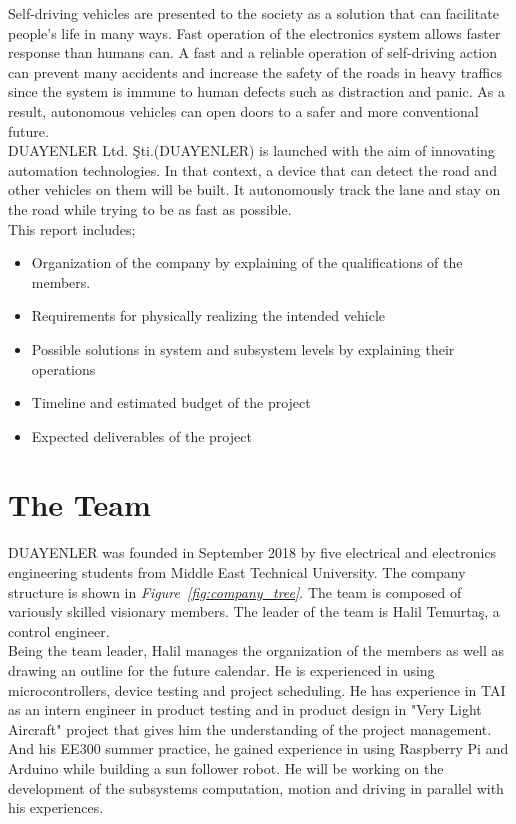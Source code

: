 \documentclass[a4paper,12pt]{article}
\begin{document}
Self-driving vehicles are presented to the society as a solution that can facilitate people's life in many ways. Fast operation of the electronics system allows faster response than humans can. A fast and a reliable operation of self-driving action can prevent many accidents and increase the safety of the roads in heavy traffics since the system is immune to human defects such as distraction and panic. As a result, autonomous vehicles can open doors to a safer and more conventional future.\\

DUAYENLER Ltd. Şti.(DUAYENLER) is launched with the aim of innovating automation technologies. In that context, a device that can detect the road and other vehicles on them will be built. It autonomously track the lane and stay on the road while trying to be as fast as possible.\\

This report includes;
\begin{itemize}
	\item Organization of the company by explaining of the qualifications of the members. 
	\item Requirements for physically realizing the intended vehicle
	\item Possible solutions in system and subsystem levels by explaining their operations
	\item Timeline and estimated budget of the project
	\item Expected deliverables of the project 
\end{itemize} 



\section{The Team}

	DUAYENLER was founded in September 2018 by five electrical and electronics engineering students from Middle East Technical University. The company structure is shown in \textit{Figure~\ref{fig:company_tree}}. The team is composed of variously skilled visionary members. The leader of the team is Halil Temurtaş, a control engineer.\\
	
	Being the team leader, Halil manages the organization of the members as well as drawing an outline for the future calendar. He is experienced in using microcontrollers, device testing and project scheduling. He has experience in TAI as an intern engineer in product testing and in product design in "Very Light Aircraft" project that gives him the understanding of the project management. And his EE300 summer practice, he gained experience in using Raspberry Pi and Arduino while building a sun follower robot. He will be working on the development of the subsystems computation, motion and driving in parallel with his experiences.\\
	
\end{document}
